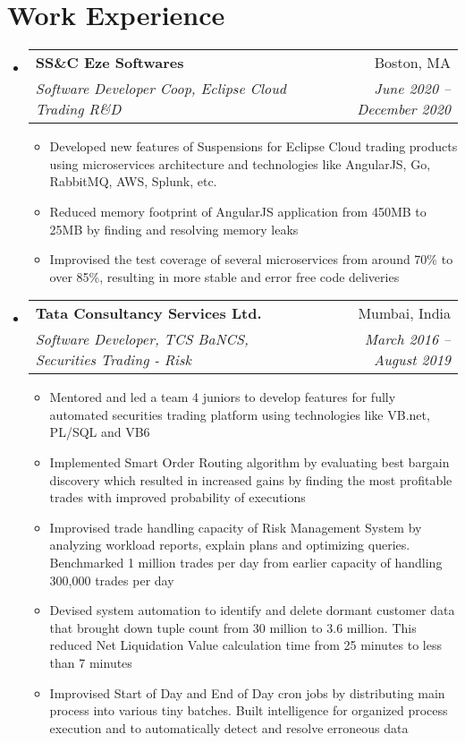 \documentclass[letterpaper,11pt]{article}
\makeatletter
\newcommand{\resumeItem}[1]{
  \item\small{
    {#1 \vspace{-2pt}}
  }
}
\newcommand{\resumeSubheading}[4]{
  \vspace{-2pt}\item
    \begin{tabular*}{0.97\textwidth}[t]{l@{\extracolsep{\fill}}r}
      \textbf{#1} & #2 \\
      \textit{\small#3} & \textit{\small #4} \\
    \end{tabular*}\vspace{-7pt}
}
\newcommand{\resumeSubHeadingListStart}{\begin{itemize}[leftmargin=0.15in, label={}]}
\newcommand{\resumeSubHeadingListEnd}{\end{itemize}}
\newcommand{\resumeItemListStart}{\begin{itemize}}
\newcommand{\resumeItemListEnd}{\end{itemize}\vspace{-5pt}}
\makeatother
\begin{document}
\section{Work Experience}
  \resumeSubHeadingListStart

    \resumeSubheading
      {SS\&C Eze Softwares}{Boston, MA}
      {Software Developer Coop, Eclipse Cloud Trading R\&D}{June 2020 -- December 2020}
      \resumeItemListStart
        \resumeItem{Developed new features of Suspensions for Eclipse Cloud trading products using microservices architecture and technologies like AngularJS, Go, RabbitMQ, AWS, Splunk, etc.}
        \resumeItem{Reduced memory footprint of AngularJS application from 450MB to 25MB by finding and resolving memory leaks}
        \resumeItem{Improvised the test coverage of several microservices from around 70\% to over 85\%, resulting in more stable and error free code deliveries}
      \resumeItemListEnd
      
    \resumeSubheading
      {Tata Consultancy Services Ltd.}{Mumbai, India}
      {Software Developer, TCS BaNCS, Securities Trading - Risk}{March 2016 -- August 2019}
      \resumeItemListStart
        \resumeItem{Mentored and led a team 4 juniors to develop features for fully automated securities trading platform using technologies like VB.net, PL/SQL and VB6}
        \resumeItem{Implemented Smart Order Routing algorithm by evaluating best bargain discovery which resulted in increased gains by finding the most profitable trades with improved probability of executions}
        \resumeItem{Improvised trade handling capacity of Risk Management System by analyzing workload reports, explain plans and optimizing queries. Benchmarked 1 million trades per day from earlier capacity of handling 300,000 trades per day}
        \resumeItem{Devised system automation to identify and delete dormant customer data that brought down tuple count from 30 million to 3.6 million. This reduced Net Liquidation Value calculation time from 25 minutes to less than 7 minutes}
        \resumeItem{Improvised Start of Day and End of Day cron jobs by distributing main process into various tiny batches. Built intelligence for organized process execution and to automatically detect and resolve erroneous data}
    \resumeItemListEnd

  \resumeSubHeadingListEnd


\end{document}
